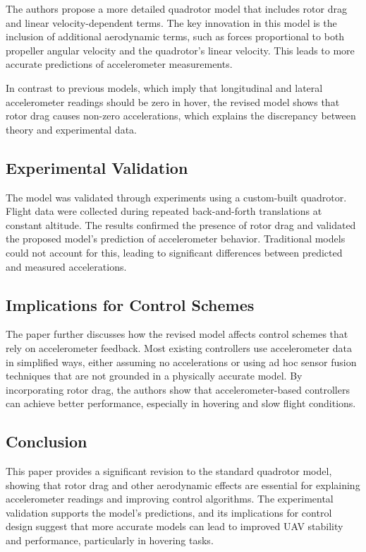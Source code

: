 \documentclass[a4paper,12pt]{article}
\begin{document}
    The authors propose a more detailed quadrotor model that includes rotor drag and linear velocity-dependent terms. The key innovation in this model is the inclusion of additional aerodynamic terms, such as forces proportional to both propeller angular velocity and the quadrotor's linear velocity. This leads to more accurate predictions of accelerometer measurements.

    In contrast to previous models, which imply that longitudinal and lateral accelerometer readings should be zero in hover, the revised model shows that rotor drag causes non-zero accelerations, which explains the discrepancy between theory and experimental data.

    \subsection{Experimental Validation}

    The model was validated through experiments using a custom-built quadrotor. Flight data were collected during repeated back-and-forth translations at constant altitude. The results confirmed the presence of rotor drag and validated the proposed model’s prediction of accelerometer behavior. Traditional models could not account for this, leading to significant differences between predicted and measured accelerations.

    \subsection{Implications for Control Schemes}

    The paper further discusses how the revised model affects control schemes that rely on accelerometer feedback. Most existing controllers use accelerometer data in simplified ways, either assuming no accelerations or using ad hoc sensor fusion techniques that are not grounded in a physically accurate model. By incorporating rotor drag, the authors show that accelerometer-based controllers can achieve better performance, especially in hovering and slow flight conditions.

    \subsection{Conclusion}

    This paper provides a significant revision to the standard quadrotor model, showing that rotor drag and other aerodynamic effects are essential for explaining accelerometer readings and improving control algorithms. The experimental validation supports the model’s predictions, and its implications for control design suggest that more accurate models can lead to improved UAV stability and performance, particularly in hovering tasks.
\end{document}
